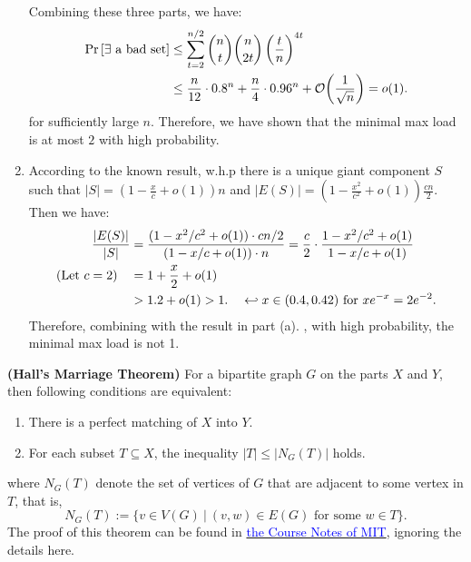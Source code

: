 \begin{answer}
\begin{enumerate}[label=\alph*).]
\begin{itemize}
        \end{itemize}
        Combining these three parts, we have:
        \begin{align*}
            \Pr\left[\exists \text{ a bad set}\right] &\le \sum_{t = 2}^{n/2} \binom{n}{t} \binom{n}{2t} \left(\frac{t}{n}\right)^{4t} \\
            &\le \frac{n}{12} \cdot 0.8^n + \frac{n}{4} \cdot 0.96^n + \order{\frac{1}{\sqrt{n}}} = o(1).
        \end{align*}
        for sufficiently large $n$. Therefore, we have shown that the minimal max load is at most $2$ with high probability.
        \item According to the known result, w.h.p there is a unique giant component  $S$ such that $|S| = (1 - \frac{x}{c} + o(1)) n$ and $|E(S)| = ( 1 - \frac{x^2}{c^2} + o(1)) \frac{cn}{2}$. 
        Then we have:
        \begin{align*}
            \frac{|E(S)|}{|S|} &= \frac{(1 - x^2 / c^2 + o(1))\cdot  cn / 2}{( 1 - x / c + o(1))\cdot n} = \frac{c}{2} \cdot \frac{1 - x^2 / c^2 + o(1)}{1 - x / c + o(1)} \\
           (\text{Let } c = 2)\quad  &= 1 + \frac{x}{2} + o(1)  \\
           &> 1.2 + o(1) > 1.   \quad \hookleftarrow \text{$ x \in (0.4, 0.42)$ for $x e^{-x} = 2 e^{-2}$.}
        \end{align*}
        Therefore, combining with the result in part (a). , with high probability, the minimal max load is not 1.
    \end{enumerate}
    \begin{lemma}\textbf{(Hall's Marriage Theorem)}
        \label{lem:hall}
        For a bipartite graph $G$ on the parts $X$ and $Y$, then following conditions are equivalent:
        \begin{enumerate}[label=(\roman*)]
            \item There is a perfect matching of $X$ into $Y$.
            \item For each subset $T \subseteq X$, the inequality $|T| \le |N_G(T)|$ holds.
        \end{enumerate}
        where $N_G(T)$ denote the set of vertices of $G$ that are adjacent to some vertex in $T$, that is,
        \begin{equation*}
            N_G(T) := \{v \in V(G) ~|~ (v,w) \in E(G) \text{ for some } w \in T\}.
        \end{equation*}
        The proof of this theorem can be found in \href{https://math.mit.edu/~fgotti/docs/Courses/Combinatorial%20Analysis/30.%20Matchings%20and%20Hall's%20Theorem/Matching%20and%20Hall's%20Theorem.pdf}{\textcolor{blue}{the Course Notes of MIT}}, ignoring the details here.
    \end{lemma}
    \ed
\end{answer}